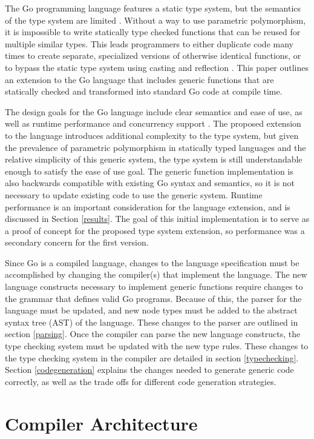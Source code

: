 \documentclass[letterpaper,11pt]{article}
\begin{document}
The Go programming language features a static type system, but the semantics of the type system are limited \cite{gospec}. Without a way to use parametric polymorphism, it is impossible to write statically type checked functions that can be reused for multiple similar types. This leads programmers to either duplicate code many times to create separate, specialized versions of otherwise identical functions, or to bypass the static type system using casting and reflection \cite{gofaq}.  This paper outlines an extension to the Go language that includes generic functions that are statically checked and transformed into standard Go code at compile time.

The design goals for the Go language include clear semantics and ease of use, as well as runtime performance and concurrency support \cite{godesign}. The proposed extension to the language introduces additional complexity to the type system, but given the prevalence of parametric polymorphism in statically typed languages and the relative simplicity of this generic system, the type system is still understandable enough to satisfy the ease of use goal. The generic function implementation is also backwards compatible with existing Go syntax and semantics, so it is not necessary to update existing code to use the generic system. Runtime performance is an important consideration for the language extension, and is discussed in Section \ref{results}. The goal of this initial implementation is to serve as a proof of concept for the proposed type system extension, so performance was a secondary concern for the first version.

Since Go is a compiled language, changes to the language specification must be accomplished by changing the compiler(s) that implement the language. The new language constructs necessary to implement generic functions require changes to the grammar that defines valid Go programs. Because of this, the parser for the language must be updated, and new node types must be added to the abstract syntax tree (AST) of the language. These changes to the parser are outlined in section \ref{parsing}. Once the compiler can parse the new language constructs, the type checking system must be updated with the new type rules. These changes to the type checking system in the compiler are detailed in section \ref{typechecking}. Section \ref{codegeneration} explains the changes needed to generate generic code correctly, as well as the trade offs for different code generation strategies. 

\section{Compiler Architecture} \label{architecture}
\end{document}
